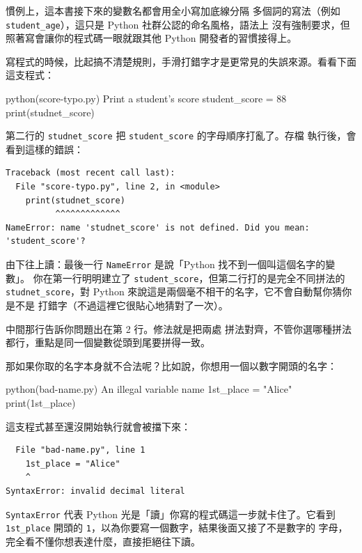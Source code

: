 慣例上，這本書接下來的變數名都會用全小寫加底線分隔
多個詞的寫法（例如 \texttt{student\_age}），這只是 Python 社群公認的命名風格，語法上
沒有強制要求，但照著寫會讓你的程式碼一眼就跟其他 Python 開發者的習慣接得上。

寫程式的時候，比起搞不清楚規則，手滑打錯字才是更常見的失誤來源。看看下面這支程式：

\begin{example}{python}{(score-typo.py) Print a student's score}
student_score = 88
print(studnet_score)
\end{example}

第二行的 \texttt{studnet\_score} 把 \texttt{student\_score} 的字母順序打亂了。存檔
執行後，會看到這樣的錯誤：

\begin{verbatim}
Traceback (most recent call last):
  File "score-typo.py", line 2, in <module>
    print(studnet_score)
          ^^^^^^^^^^^^^
NameError: name 'studnet_score' is not defined. Did you mean: 'student_score'?
\end{verbatim}

由下往上讀：最後一行 \texttt{NameError} 是說「Python 找不到一個叫這個名字的變數」。
你在第一行明明建立了 \texttt{student\_score}，但第二行打的是完全不同拼法的
\texttt{studnet\_score}，對 Python 來說這是兩個毫不相干的名字，它不會自動幫你猜你是不是
打錯字（不過這裡它很貼心地猜對了一次）。

中間那行告訴你問題出在第 2 行。修法就是把兩處
拼法對齊，不管你選哪種拼法都行，重點是同一個變數從頭到尾要拼得一致。


那如果你取的名字本身就不合法呢？比如說，你想用一個以數字開頭的名字：

\begin{example}{python}{(bad-name.py) An illegal variable name}
1st_place = "Alice"
print(1st_place)
\end{example}

這支程式甚至還沒開始執行就會被擋下來：

\begin{verbatim}
  File "bad-name.py", line 1
    1st_place = "Alice"
    ^
SyntaxError: invalid decimal literal
\end{verbatim}

\texttt{SyntaxError} 代表 Python 光是「讀」你寫的程式碼這一步就卡住了。它看到
\texttt{1st\_place} 開頭的 \texttt{1}，以為你要寫一個數字，結果後面又接了不是數字的
字母，完全看不懂你想表達什麼，直接拒絕往下讀。

